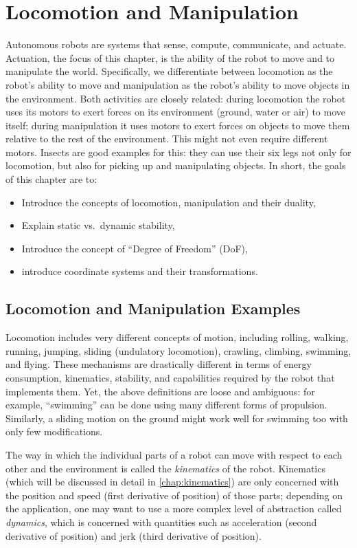 \chapter{Locomotion and Manipulation}\label{chap:locomotion}

Autonomous robots are systems that sense, compute, communicate, and actuate. Actuation, the focus of this chapter, is the ability of the robot to move and to manipulate the world. Specifically, we differentiate between locomotion as the robot's ability to move and manipulation as the robot's ability to move objects in the environment. Both activities are closely related: during locomotion the robot uses its motors to exert forces on its environment (ground, water or air) to move itself; during manipulation it uses motors to exert forces on objects to move them relative to the rest of the environment. This might not even require different motors. Insects are good examples for this: they can use their six legs not only for locomotion, but also for picking up and manipulating objects. In short, the goals of this chapter are to:
\begin{itemize}
\item Introduce the concepts of locomotion, manipulation and their duality,
\item Explain static vs.\ dynamic stability,
\item Introduce the concept of ``Degree of Freedom'' (DoF),
\item introduce coordinate systems and their transformations.
\end{itemize}

\section{Locomotion and Manipulation Examples}

Locomotion includes very different concepts of motion, including rolling, walking, running, jumping, sliding (undulatory locomotion), crawling, climbing, swimming, and flying. These mechanisms are drastically different in terms of energy consumption, kinematics, stability, and capabilities required by the robot that implements them. Yet, the above definitions are loose and ambiguous: for example, ``swimming'' can be done using many different forms of propulsion. Similarly, a sliding motion on the ground might work well for swimming too with only few modifications.

The way in which the individual parts of a robot can move with respect to each other and the environment is called the \textsl{kinematics} of the robot. Kinematics (which will be discussed in detail in \cref{chap:kinematics}) are only concerned with the position and speed (first derivative of position) of those parts; depending on the application, one may want to use a more complex level of abstraction called \textsl{dynamics}, which is concerned with quantities such as acceleration (second derivative of position) and jerk (third derivative of position).

